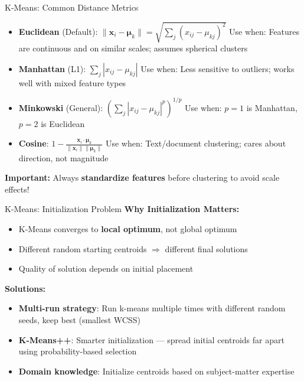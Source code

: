 \documentclass[11pt]{beamer}
\begin{document}
\begin{frame}{K-Means: Common Distance Metrics}
	\begin{itemize}
		\setlength{\itemsep}{0.15cm}
		\item \textbf{Euclidean} (Default): $\|\mathbf{x}_i - \boldsymbol{\mu}_k\| = \sqrt{\sum_j (x_{ij} - \mu_{kj})^2}$ \newline
		  Use when: Features are continuous and on similar scales; assumes spherical clusters
		\item \textbf{Manhattan} (L1): $\sum_j |x_{ij} - \mu_{kj}|$ \newline
		  Use when: Less sensitive to outliers; works well with mixed feature types
		\item \textbf{Minkowski} (General): $\left(\sum_j |x_{ij} - \mu_{kj}|^p\right)^{1/p}$ \newline
		  Use when: $p=1$ is Manhattan, $p=2$ is Euclidean
		\item \textbf{Cosine}: $1 - \frac{\mathbf{x}_i \cdot \boldsymbol{\mu}_k}{\|\mathbf{x}_i\| \|\boldsymbol{\mu}_k\|}$ \newline
		  Use when: Text/document clustering; cares about direction, not magnitude
	\end{itemize}

	\vspace{0.2cm}

	\textbf{Important:} Always \textbf{standardize features} before clustering to avoid scale effects!
\end{frame}

\begin{frame}{K-Means: Initialization Problem}
	\textbf{Why Initialization Matters:}
	\begin{itemize}
		\setlength{\itemsep}{0.15cm}
		\item K-Means converges to \textbf{local optimum}, not global optimum
		\item Different random starting centroids $\Rightarrow$ different final solutions
		\item Quality of solution depends on initial placement
	\end{itemize}

	\vspace{0.3cm}

	\textbf{Solutions:}
	\begin{itemize}
		\setlength{\itemsep}{0.15cm}
		\item \textbf{Multi-run strategy}: Run k-means multiple times with different random seeds, keep best (smallest WCSS)
		\item \textbf{K-Means++}: Smarter initialization --- spread initial centroids far apart using probability-based selection
		\item \textbf{Domain knowledge}: Initialize centroids based on subject-matter expertise
	\end{itemize}
\end{frame}
\end{document}
